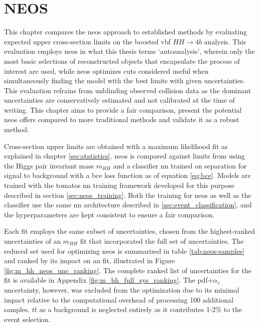 \chapter{NEOS}
This chapter compares the \ac{neos} approach to established methods by evaluating expected upper cross-section limits on the boosted \ac{vbf} $HH\rightarrow4b$ analysis. This evaluation employs \ac{neos} in what this thesis terms `autoanalysis', wherein only the most basic selections of reconstructed objects that encapsulate the process of interest are used, while \ac{neos} optimizes cuts considered useful when simultaneously finding the model with the best limits with given uncertainties. This evaluation refrains from unblinding observed collision data as the dominant uncertainties are conservatively estimated and not calibrated at the time of writing. This chapter aims to provide a fair comparison, present the potential \ac{neos} offers compared to more traditional methods and validate it as a robust method.

Cross-section upper limits are obtained with a maximum likelihood fit as explained in chapter \ref{sec:statistics}. \ac{neos} is compared against limits from using the Higgs pair invariant mass $m_{HH}$ and a classifier \ac{nn} trained on separation for signal to background with a \ac{bce} loss function as of equation \ref{eq:bce}. Models are trained with the \ac{tomatos} \ac{nn} training framework developed for this purpose \citep{tomatos} described in section \ref{sec:neos_training}. Both the training for \ac{neos} as well as the classifier use the same \ac{nn} architecture described in \ref{sec:event_classification}, and the hyperparameters are kept consistent to ensure a fair comparison.

Each fit employs the same subset of uncertainties, chosen from the highest-ranked uncertainties of an $m_{HH}$ fit that incorporated the full set of uncertainties. The reduced set used for optimizing \ac{neos} is summarized in table \ref{tab:neos-samples} and ranked by its impact on an \mhh fit, illustrated in Figure \ref{fig:m_hh_neos_unc_ranking}. The complete ranked list of uncertainties for the \mhh fit is available in Appendix \ref{fig:m_hh_full_sys_ranking}. The \ac{pdf}+$\alpha_s$ uncertainty, however, was excluded from the optimization due to its minimal impact relative to the computational overhead of processing 100 additional samples. $t\overline{t}$ as a background is neglected entirely as it contributes 1-2\% to the event selection.

